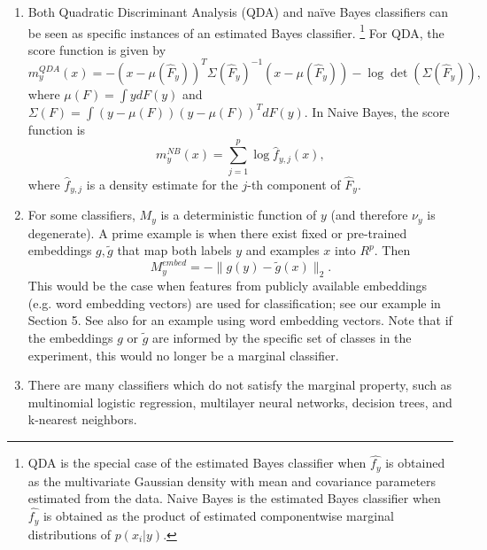 \documentclass[twoside,11pt]{article}
\begin{document}
\begin{enumerate}

\item Both Quadratic Discriminant Analysis (QDA) and na\"{i}ve Bayes
  classifiers can be seen as specific instances of an estimated Bayes
  classifier.
\footnote{QDA is the special case of the estimated Bayes classifier
  when $\hat{f_y}$ is obtained as the multivariate Gaussian density
  with mean and covariance parameters estimated from the data.  Naive
  Bayes is the estimated Bayes classifier when $\hat{f_y}$ is obtained
  as the product of estimated componentwise marginal distributions of
  $p(x_i|y)$.}  For QDA, the score function is given by
\[
m_y^{QDA}(x) = -(x - \mu(\hat{F}_y))^T \Sigma(\hat{F}_y)^{-1} (x-\mu(\hat{F}_y)) - \log\det(\Sigma(\hat{F}_y)),
\]
where $\mu(F) = \int y dF(y)$ and $\Sigma(F) = \int (y-\mu(F))(y-\mu(F))^T dF(y)$.
In Naive Bayes, the score function is
\[
m^{NB}_y(x) = \sum_{j=1}^p \log \hat{f}_{y, j}(x),
\]
where $\hat{f}_{y, j}$ is a density estimate for the $j$-th component of
$\hat{F}_y$.
\item For some classifiers, $M_y$ is a deterministic function of $y$
  (and therefore $\nu_y$ is degenerate). A prime example is when
  there exist fixed or pre-trained embeddings $g, \tilde{g}$ that map both
  labels $y$ and examples $x$ into $R^p$. Then
\begin{equation}
M_y^{embed} = -\|g(y) - \tilde{g}(x)\|_2.
\end{equation}
This would be the case when features from publicly available embeddings (e.g. word embedding vectors) are used for classification; see our example in Section 5.
See also \cite{pereira2018toward} for an example using word embedding vectors. 
Note that if the embeddings $g$ or $\tilde{g}$ are informed by the specific set of classes in the experiment, this would no longer be a marginal classifier. %

\item There are many classifiers which do not satisfy the marginal
  property, such as multinomial logistic regression, multilayer neural
  networks, decision trees, and k-nearest neighbors.
\end{enumerate}
\end{document}
